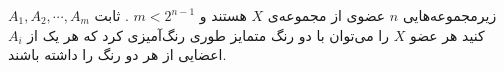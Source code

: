 \EXERCISE
$A_1, A_2, \cdots, A_m$
زیرمجموعه‌هایی
$n$
عضوی از مجموعه‌ی
$X$
هستند و
$m < 2^{n-1}$
. ثابت کنید هر عضو
$X$
را می‌توان با دو رنگ متمایز طوری رنگ‌آمیزی کرد که هر یک از
$A_i$
اعضایی از هر دو رنگ را داشته باشند.